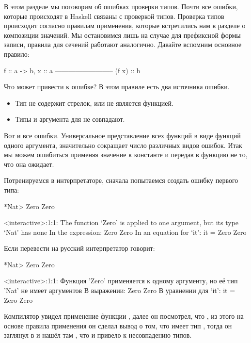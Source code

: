 В этом разделе мы поговорим об ошибках проверки типов. 
Почти все ошибки, которые происходят в Haskell связаны с 
проверкой типов. Проверка типов происходит согласно правилам
применения, которые встретились нам в разделе о композиции 
значений. 
Мы остановимся лишь на случае для префиксной формы записи, 
правила для сечений работают аналогично. 
Давайте вспомним основное правило:

\begin{code}
                    f :: a -> b,       x :: a
                    --------------------------
                            (f x) :: b
\end{code}

Что может привести к ошибке? В этом правиле есть
два источника ошибки. 

\begin{itemize}
\item Тип  не содержит стрелок, или  не является функцией. 
\item Типы  и аргумента для  не совпадают.
\end{itemize}

Вот и все ошибки. Универсальное представление всех функций 
в виде функций одного аргумента, значительно сокращает число
различных видов ошибок. Итак мы можем ошибиться применяя
значение к константе и передав в функцию не то, что она
ожидает.

Потренируемся в интерпретаторе, сначала попытаемся
создать ошибку первого типа:

\begin{code}
*Nat> Zero Zero

<interactive>:1:1:
    The function `Zero' is applied to one argument,
    but its type `Nat' has none
    In the expression: Zero Zero
    In an equation for `it': it = Zero Zero
\end{code}

Если перевести на русский интерпретатор говорит: 

\begin{code}
*Nat> Zero Zero

<interactive>:1:1:
	Функция 'Zero' применяется к одному аргументу,
	но её тип 'Nat'	не имеет аргументов
    В выражении: Zero Zero
    В уравнении для `it': it = Zero Zero
\end{code}

Компилятор увидел применение функции , далее он 
посмотрел, что , из этого на основе правила применения
он сделал вывод о том, что  имеет тип ,
тогда он заглянул в  и нашёл там , что
и привело к несовпадению типов. 


